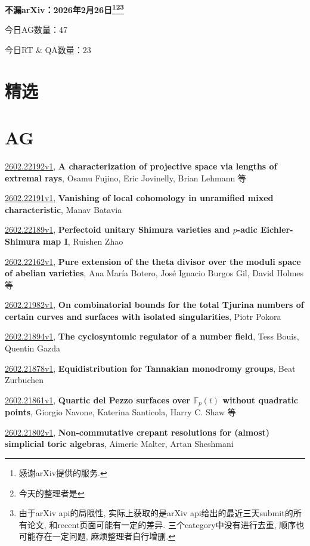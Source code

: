 \documentclass[9pt, a4paper]{article}
\theoremstyle{plain}
\theoremstyle{definition}
\theoremstyle{remark}
\newcommand{\arxiv}[3]{\href{https://arxiv.org/abs/#1}{#1}, \textbf{\textcolor{arxivblue}{#2}}, #3}
\newcommand{\AGnumber}{47}
\newcommand{\RTQAnumber}{23}
\newcommand{\NewestDate}{2026年2月26日}
\newcommand{\todayarXiver}{} %
\begin{document}
\begin{center}
    \Huge\textbf{不漏arXiv：\NewestDate\footnote{感谢arXiv提供的服务.}\footnote{今天的整理者是\todayarXiver}\footnote{由于arXiv api的局限性, 实际上获取的是arXiv api给出的最近三天submit的所有论文, 和recent页面可能有一定的差异. 三个category中没有进行去重, 顺序也可能存在一定问题, 麻烦整理者自行增删.}} \\
\end{center}

\setcounter{section}{-1}

\begin{center}
    今日AG数量：\AGnumber
    
    今日RT \& QA数量：\RTQAnumber
    
\end{center}


\section{精选}


\section{AG}
\arxiv{2602.22192v1}{A characterization of projective space via lengths of extremal rays}{Osamu Fujino, Eric Jovinelly, Brian Lehmann 等}

\arxiv{2602.22191v1}{Vanishing of local cohomology in unramified mixed characteristic}{Manav Batavia}

\arxiv{2602.22189v1}{Perfectoid unitary Shimura varieties and $p$-adic Eichler-Shimura map I}{Ruishen Zhao}

\arxiv{2602.22162v1}{Pure extension of the theta divisor over the moduli space of abelian varieties}{Ana María Botero, José Ignacio Burgos Gil, David Holmes 等}

\arxiv{2602.21982v1}{On combinatorial bounds for the total Tjurina numbers of certain curves and surfaces with isolated singularities}{Piotr Pokora}

\arxiv{2602.21894v1}{The cyclosyntomic regulator of a number field}{Tess Bouis, Quentin Gazda}

\arxiv{2602.21878v1}{Equidistribution for Tannakian monodromy groups}{Beat Zurbuchen}

\arxiv{2602.21861v1}{Quartic del Pezzo surfaces over $\mathbb{F}_p(t)$ without quadratic points}{Giorgio Navone, Katerina Santicola, Harry C. Shaw 等}

\arxiv{2602.21802v1}{Non-commutative crepant resolutions for (almost) simplicial toric algebras}{Aimeric Malter, Artan Sheshmani}
\end{document}
